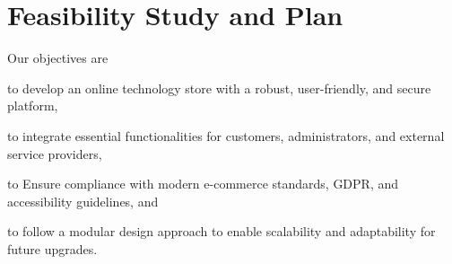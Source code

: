 \documentclass[twoside,a4paper,journal]{IEEEtran}
\begin{document}
%



\section{Feasibility Study and Plan}
Our objectives are
\begin{enumerate*}
  \item to develop an online technology store with a robust, user-friendly,
    and secure platform,
  \item to integrate essential functionalities for customers, administrators,
    and external service providers,
  \item to Ensure compliance with modern e-commerce standards, GDPR, and
    accessibility guidelines, and
  \item to follow a modular design approach to enable scalability and
    adaptability for future upgrades.
\end{enumerate*}
\end{document}
